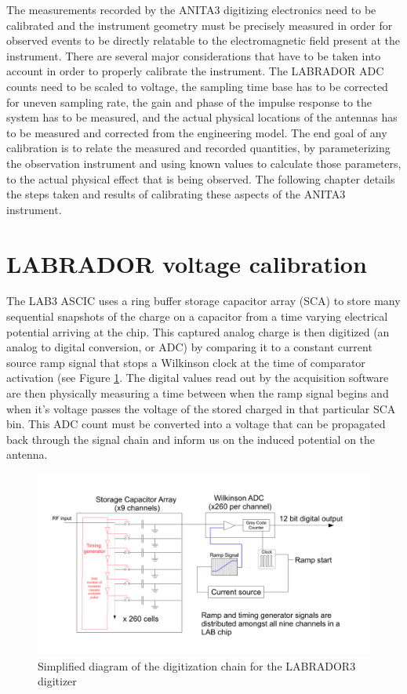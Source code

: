 	The measurements recorded by the ANITA3 digitizing electronics need to be calibrated and the instrument geometry must be precisely measured in order for observed events to be directly relatable to the electromagnetic field present at the instrument.  There are several major considerations that have to be taken into account in order to properly calibrate the instrument.  The LABRADOR ADC counts need to be scaled to voltage, the sampling time base has to be corrected for uneven sampling rate, the gain and phase of the impulse response to the system has to be measured, and the actual physical locations of the antennas has to be measured and corrected from the engineering model.  The end goal of any calibration is to relate the measured and recorded quantities, by parameterizing the observation instrument and using known values to calculate those parameters, to the actual physical effect that is being observed.  The following chapter details the steps taken and results of calibrating these aspects of the ANITA3 instrument.
	

	
\section{LABRADOR voltage calibration}
		The LAB3 ASCIC uses a ring buffer storage capacitor array (SCA) to store many sequential snapshots of the charge on a capacitor from a time varying electrical potential arriving at the chip.  This captured analog charge is then digitized (an analog to digital conversion, or ADC) by comparing it to a constant current source ramp signal that stops a Wilkinson clock at the time of comparator activation (see Figure \ref{fig:Lab_Digitization}.  The digital values read out by the acquisition software are then physically measuring a time between when the ramp signal begins and when it's voltage passes the voltage of the stored charged in that particular SCA bin.  This ADC count must be converted into a voltage that can be propagated back through the signal chain and inform us on the induced potential on the antenna.

\begin{figure}
	\includegraphics[width=\textwidth]{figures/LAB_Digitization}
	\caption{Simplified diagram of the digitization chain for the LABRADOR3 digitizer}
	\label{fig:Lab_Digitization}
\end{figure}	
		



